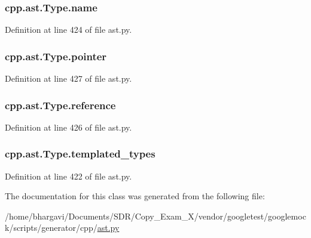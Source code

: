 \subsubsection[{\texorpdfstring{name}{name}}]{\setlength{\rightskip}{0pt plus 5cm}cpp.\+ast.\+Type.\+name}\hypertarget{classcpp_1_1ast_1_1_type_a5905424e2b65f0215b6ecd73b4bfe24c}{}\label{classcpp_1_1ast_1_1_type_a5905424e2b65f0215b6ecd73b4bfe24c}


Definition at line 424 of file ast.\+py.

\subsubsection[{\texorpdfstring{pointer}{pointer}}]{\setlength{\rightskip}{0pt plus 5cm}cpp.\+ast.\+Type.\+pointer}\hypertarget{classcpp_1_1ast_1_1_type_a37234bb68915c93894cbc8e366c1eaad}{}\label{classcpp_1_1ast_1_1_type_a37234bb68915c93894cbc8e366c1eaad}


Definition at line 427 of file ast.\+py.

\subsubsection[{\texorpdfstring{reference}{reference}}]{\setlength{\rightskip}{0pt plus 5cm}cpp.\+ast.\+Type.\+reference}\hypertarget{classcpp_1_1ast_1_1_type_a8d2cddd631397c3bf86198cc420d584d}{}\label{classcpp_1_1ast_1_1_type_a8d2cddd631397c3bf86198cc420d584d}


Definition at line 426 of file ast.\+py.

\subsubsection[{\texorpdfstring{templated\+\_\+types}{templated_types}}]{\setlength{\rightskip}{0pt plus 5cm}cpp.\+ast.\+Type.\+templated\+\_\+types}\hypertarget{classcpp_1_1ast_1_1_type_a7c38fcafa00dae6ee22bab783086a1a7}{}\label{classcpp_1_1ast_1_1_type_a7c38fcafa00dae6ee22bab783086a1a7}


Definition at line 422 of file ast.\+py.



The documentation for this class was generated from the following file\+:\begin{DoxyCompactItemize}
\item 
/home/bhargavi/\+Documents/\+S\+D\+R/\+Copy\+\_\+\+Exam\+\_\+X/vendor/googletest/googlemock/scripts/generator/cpp/\hyperlink{ast_8py}{ast.\+py}\end{DoxyCompactItemize}
